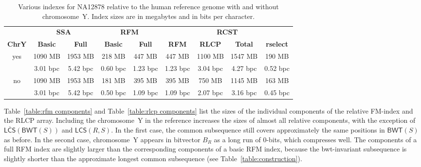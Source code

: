 \documentclass[a4paper,11pt]{llncs}
\renewcommand{\complement}[1]{\ensuremath{\overline{ #1 }}}
\newcommand{\RCST}{\textsf{RCST}}
\newcommand{\SSA}{\textsf{SSA}}
\newcommand{\RFM}{\textsf{RFM}}
\newcommand{\mBWT}{\ensuremath{\mathsf{BWT}}}
\newcommand{\RLCP}{\textsf{RLCP}}
\newcommand{\mLCS}{\ensuremath{\mathsf{LCS}}}
\newcommand{\mCS}{\ensuremath{\complement{\mathsf{LCS}}}}
\newcommand{\rselect}{\textsf{rselect}}
\newcommand{\zerobit}{$0$\nobreakdash-bit}
\begin{document}
\begin{table}
\caption{Various indexes for NA12878 relative to the human reference genome with and without chromosome~Y. Index sizes are in megabytes and in bits per character.}\label{table:indexes}
\setlength{\extrarowheight}{2pt}
\setlength{\tabcolsep}{3pt}
\begin{center}
\begin{tabular}{c|cc|cc|cccc}
\hline
 &
\multicolumn{2}{c|}{\textbf{\SSA}} &
\multicolumn{2}{c|}{\textbf{\RFM}} &
\multicolumn{4}{c}{\textbf{\RCST}} \\
\textbf{ChrY} &
\textbf{Basic} & \textbf{Full} &
\textbf{Basic} & \textbf{Full} &
\textbf{\RFM} & \textbf{\RLCP} & \textbf{Total} & \textbf{\rselect} \\
\hline
\multirow{2}{*}{yes} &  1090 MB &  1953 MB &   218 MB &   447 MB &   447 MB &  1100 MB &  1547 MB &   190 MB \\
                     & 3.01 bpc & 5.42 bpc & 0.60 bpc & 1.23 bpc & 1.23 bpc & 3.04 bpc & 4.27 bpc & 0.52 bpc \\
\hline
\multirow{2}{*}{no}  &  1090 MB &  1953 MB &   181 MB &   395 MB &   395 MB &   750 MB &  1145 MB &   163 MB \\
                     & 3.01 bpc & 5.42 bpc & 0.50 bpc & 1.09 bpc & 1.09 bpc & 2.07 bpc & 3.16 bpc & 0.45 bpc \\
\hline
\end{tabular}
\end{center}
\end{table}

Table~\ref{table:rfm components} and Table~\ref{table:rlcp components} list the sizes of the individual components of the relative FM-index and the \RLCP{} array. Including the chromosome~Y in the reference increases the sizes of almost all relative components, with the exception of $\mCS(\mBWT(S))$ and $\mLCS(R,S)$. In the first case, the common subsequence still covers approximately the same positions in $\mBWT(S)$ as before. In the second case, chromosome~Y appears in bitvector $B_{R}$ as a long run of \zerobit{}s, which compresses well. The components of a full \RFM{} index are slightly larger than the corresponding components of a basic \RFM{} index, because the bwt-invariant subsequence is slightly shorter than the approximate longest common subsequence (see Table~\ref{table:construction}).
\end{document}
